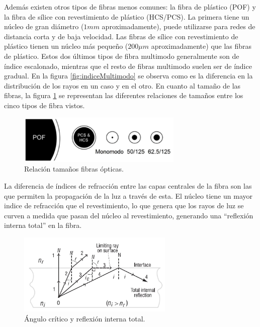  	Además existen otros tipos de fibras menos comunes: la fibra de plástico (POF) y la fibra de sílice con revestimiento de plástico (HCS/PCS). La primera tiene un núcleo de gran diámetro ($1mm$ aproximadamente), puede utilizarse para redes de distancia corta y de baja velocidad. Las fibras de sílice con revestimiento de plástico tienen un núcleo más pequeño ($200\mu m$ aproximadamente) que las fibras de plástico. Estos dos últimos tipos de fibra multimodo generalmente son de índice escalonado, mientras que el resto de fibras multimodo suelen ser de índice gradual. En la figura \ref{fig:indiceMultimodo} se observa como es la diferencia en la distribución de los rayos en un caso y en el otro. En cuanto al tamaño de las fibras, la figura \ref{fig:otrosTiposFO} se representan las diferentes relaciones de tamaños entre los cinco tipos de fibra vistos. \cite{FOA}
 	 	
 	 \begin{figure}[H]
 	 	\centering
 	 	\includegraphics[width=0.7\textwidth]{./img/tiposFO}
 	 	\caption{Relación tamaños fibras ópticas. \cite{FOA} } 
 	 	\label{fig:otrosTiposFO}
 	 \end{figure} 	
  	
 La diferencia de índices de refracción entre las capas centrales de la fibra son las que permiten la propagación de la luz a través de esta. El núcleo tiene un mayor indice de refracción que el revestimiento, lo que genera que los rayos de luz se curven a medida que pasan del núcleo al revestimiento, generando una ``reflexión interna total'' en la fibra.%
 
 \begin{figure}[H]
 	\centering
 	\includegraphics[width=0.66\textwidth]{./img/TIR}
 	\caption{Ángulo crítico y reflexión interna total. \cite{geometriaBasicaFP} } 
 	\label{fig:TIR}
 \end{figure}
 
